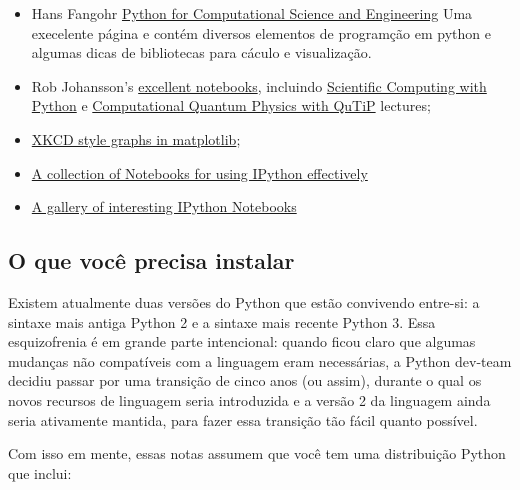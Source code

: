 \documentclass[11pt]{article}
\providecommand{\tightlist}{%
      \setlength{\itemsep}{0pt}\setlength{\parskip}{0pt}}
\begin{document}
\begin{itemize}
\tightlist
\item
  Hans Fangohr
  \href{http://www.southampton.ac.uk/~fangohr/index.html}{Python for
  Computational Science and Engineering} Uma execelente página e contém
  diversos elementos de programção em python e algumas dicas de
  bibliotecas para cáculo e visualização.
\item
  Rob Johansson's \href{http://jrjohansson.github.io/}{excellent
  notebooks}, incluindo
  \href{https://github.com/jrjohansson/scientific-python-lectures}{Scientific
  Computing with Python} e
  \href{https://github.com/jrjohansson/qutip-lectures}{Computational
  Quantum Physics with QuTiP} lectures;
\item
  \href{http://nbviewer.ipython.org/url/jakevdp.github.com/downloads/notebooks/XKCD_plots.ipynb}{XKCD
  style graphs in matplotlib};
\item
  \href{https://github.com/ipython/ipython/tree/master/examples/notebooks\#a-collection-of-notebooks-for-using-ipython-effectively}{A
  collection of Notebooks for using IPython effectively}
\item
  \href{https://github.com/ipython/ipython/wiki/A-gallery-of-interesting-IPython-Notebooks}{A
  gallery of interesting IPython Notebooks}
\end{itemize}

\subsection{O que você precisa
instalar}\label{o-que-vocuxea-precisa-instalar}

Existem atualmente duas versões do Python que estão convivendo entre-si:
a sintaxe mais antiga Python 2 e a sintaxe mais recente Python 3. Essa
esquizofrenia é em grande parte intencional: quando ficou claro que
algumas mudanças não compatíveis com a linguagem eram necessárias, a
Python dev-team decidiu passar por uma transição de cinco anos (ou
assim), durante o qual os novos recursos de linguagem seria introduzida
e a versão 2 da linguagem ainda seria ativamente mantida, para fazer
essa transição tão fácil quanto possível.

Com isso em mente, essas notas assumem que você tem uma distribuição
Python que inclui:
\end{document}
